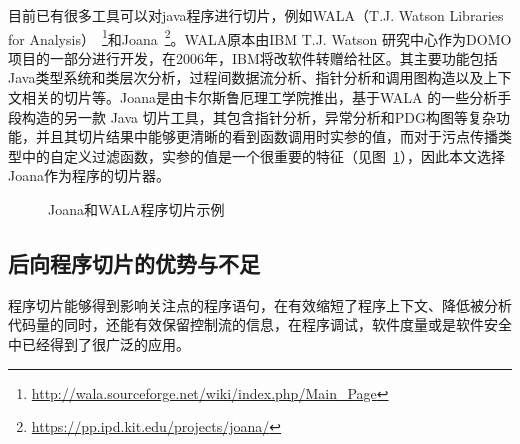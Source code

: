 目前已有很多工具可以对java程序进行切片，例如WALA（T.J. Watson Libraries for Analysis）~\footnote{\url{http://wala.sourceforge.net/wiki/index.php/Main_Page}}和Joana~\footnote{\url{https://pp.ipd.kit.edu/projects/joana/}}。WALA原本由IBM T.J. Watson 研究中心作为DOMO项目的一部分进行开发，在2006年，IBM将改软件转赠给社区。其主要功能包括Java类型系统和类层次分析，过程间数据流分析、指针分析和调用图构造以及上下文相关的切片等。Joana是由卡尔斯鲁厄理工学院推出，基于WALA 的一些分析手段构造的另一款 Java 切片工具，其包含指针分析，异常分析和PDG构图等复杂功能，并且其切片结果中能够更清晰的看到函数调用时实参的值，而对于污点传播类型中的自定义过滤函数，实参的值是一个很重要的特征（见图~\ref{fig:sliceresult}），因此本文选择Joana作为程序的切片器。\\
\begin{figure}[!htbp]
	\centering
	\caption{Joana和WALA程序切片示例}
	\label{fig:sliceresult} %
\end{figure}

\subsection{后向程序切片的优势与不足}
程序切片能够得到影响关注点的程序语句，在有效缩短了程序上下文、降低被分析代码量的同时，还能有效保留控制流的信息，在程序调试，软件度量或是软件安全中已经得到了很广泛的应用。

